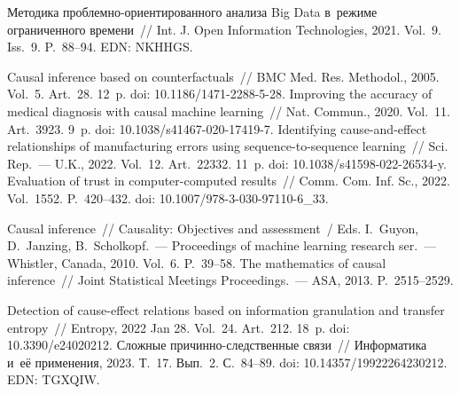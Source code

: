 \begin{multicols}{2}
\vspace*{-9pt}
  
{\small\frenchspacing
 { %
 \begin{thebibliography}{9}
 Методика проб\-лем\-но-ори\-ен\-ти\-ро\-ван\-но\-го анализа Big Data 
в~режиме ограниченного времени~// Int. J. Open Information Technologies, 2021. Vol.~9. Iss.~9. 
P.~88--94. EDN: NKHHGS.

 Causal inference based on counterfactuals~// BMC Med. Res. 
Methodol., 2005. Vol.~5. Art.~28. 12~p. doi: 10.1186/1471-2288-5-28.
 Improving the accuracy of medical diagnosis with causal 
machine learning~// Nat. Commun., 2020. Vol.~11. Art.~3923. 9~p. doi:  
10.1038/s41467-020-17419-7.
 Identifying  
cause-and-effect relationships of manufacturing errors using sequence-to-sequence learning~// Sci. 
Rep.~--- U.K., 2022. Vol.~12. Art.~22332. 11~p. doi: 10.1038/s41598-022-26534-y.
 Evaluation of trust in computer-computed 
results~// Comm. Com.  Inf. Sc., 2022. Vol.~1552. P.~420--432. doi:  
10.1007/978-3-030-97110-6\_33.

 Causal inference~// Causality: Objectives and assessment~/ Eds. I.~Guyon, D.~Janzing, B.~Scholkopf.~--- Proceedings of machine learning research 
ser.~--- Whistler, Canada, 2010. Vol.~6. P.~39--58. 
 The mathematics of causal inference~// Joint Statistical Meetings Proceedings.~--- ASA, 
2013. P.~2515--2529.

 Detection of cause-effect relations based on information granulation 
and transfer entropy~// Entropy, 2022 Jan 28. Vol.~24. Art.~212. 18~p. doi: 10.3390/e24020212.
 Сложные  
при\-чин\-но-след\-ст\-вен\-ные связи~// Информатика и~её применения, 2023. Т.~17. Вып.~2. 
С.~84--89. doi: 10.14357/19922264230212. EDN: TGXQIW.
\end{thebibliography}

 }
 }

\end{multicols}

\vspace*{-8pt}

